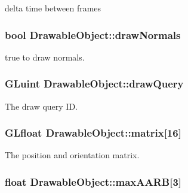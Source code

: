 delta time between frames \hypertarget{class_drawable_object_a7edaffb26b2265b38cdfcc97883ba98b}{
\subsubsection[{draw\-Normals}]{\setlength{\rightskip}{0pt plus 5cm}bool {\bf Drawable\-Object\-::draw\-Normals}}}\label{class_drawable_object_a7edaffb26b2265b38cdfcc97883ba98b}
true to draw normals. \hypertarget{class_drawable_object_aebc658d36b01bd8f5baa153b6d77652b}{
\subsubsection[{draw\-Query}]{\setlength{\rightskip}{0pt plus 5cm}G\-Luint {\bf Drawable\-Object\-::draw\-Query}}}\label{class_drawable_object_aebc658d36b01bd8f5baa153b6d77652b}
The draw query I\-D. \hypertarget{class_drawable_object_a2703563492849f1157e2f069ed80fc80}{
\subsubsection[{matrix}]{\setlength{\rightskip}{0pt plus 5cm}G\-Lfloat {\bf Drawable\-Object\-::matrix}\mbox{[}16\mbox{]}}}\label{class_drawable_object_a2703563492849f1157e2f069ed80fc80}
The position and orientation matrix. \hypertarget{class_drawable_object_a3410849bc648108304595e21c11a78f8}{
\subsubsection[{max\-A\-A\-R\-B}]{\setlength{\rightskip}{0pt plus 5cm}float {\bf Drawable\-Object\-::max\-A\-A\-R\-B}\mbox{[}3\mbox{]}}}\label{class_drawable_object_a3410849bc648108304595e21c11a78f8}
